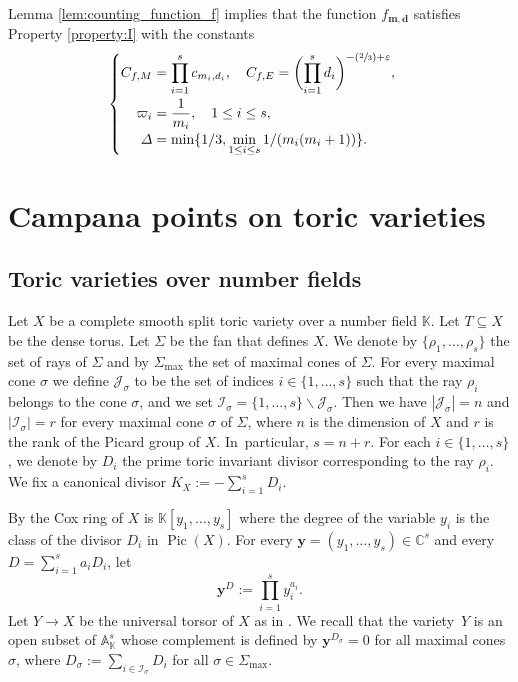 \documentclass[11pt]{article}
\numberwithin{equation}{section}
\newcommand{\Psfrac}[2]{(\sfrac{#1}{#2})}
\let\vardel\varDelta
\newcommand{\bfy}{\boldsymbol{y}}
\newcommand{\bfm}{{\boldsymbol{m}}}
\newcommand{\bfd}{\boldsymbol{d}}
\newcommand\CC{\mathbb{C}}
\newcommand{\KK}{\mathbb{K}}
\newcommand{\A}{\mathbb{A}}
\newcommand{\ii}[1]{\mathcal{J}_{#1}}
\newcommand{\ic}[1]{\mathcal{I}_{#1}}
\DeclareMathOperator{\pic}{Pic}
\theoremstyle{definition}
\numberwithin{theorem}{section}
\begin{document}
Lemma \ref{lem:counting_function_f} implies that the function $f_{\bfm, \bfd}$ satisfies Property \ref{property:I} with the constants
\[
\begin{cases}
\begin{aligned}
C_{f,M} &= \prod_{i=1}^s c_{m_i,d_i}, \quad C_{f,E} = \biggl(\prod_{i=1}^sd_i\biggr)^{-\Psfrac23+\varepsilon},\\
\varpi_i&= \frac{1}{m_i}, \quad 1\leq i\leq s,\\
\vardel &= \min \{ 1/3 , \min_{1\leq i\leq s}1/(m_i(m_i+1)) \}.
\end{aligned}
\end{cases}
\]

\section{Campana points on toric varieties}
\label{sec:Campana_points_on_toric_varieties}
\subsection{Toric varieties over number fields}

Let $X$ be a complete smooth split toric variety over a number field $\KK$.
Let $T\subseteq X$ be the dense torus.
Let $\Sigma$ be the fan that defines $X$.
We denote by $\{\rho_1,\dots,\rho_s\}$ the set of rays of $\Sigma$
and by $\Sigma_{\max}$ the set of maximal cones of $\Sigma$.
For every maximal cone $\sigma$ we define $\ii{\sigma}$ to be the set of indices
$i\in\{1,\dots,s\}$ such that the ray $\rho_i$ belongs to the cone $\sigma$,
and we set $\ic{\sigma}=\{1,\dots,s\}\smallsetminus \ii{\sigma}$.
Then we have $|\ii{\sigma}|=n$ and $|\ic{\sigma}|=r$ for every maximal cone $\sigma$ of $\Sigma$,
where $n$ is the dimension of $X$ and $r$ is the rank of the Picard group of $X$.
In~particular, $s=n+r$.
For each $i\in\{1,\dots,s\}$, we denote by $D_i$ the prime toric invariant divisor
corresponding to the ray $\rho_i$. We fix a canonical divisor $K_X:=-\sum_{i=1}^s D_i$.

By \cite{MR1299003} the Cox ring of $X$ is $\KK[y_1,\dots,y_s]$
where the degree of the variable $y_i$ is
the class of the divisor $D_i$ in $\pic(X)$.
For every $\bfy=(y_1,\dots,y_s)\in \CC^{s}$ and every $D=\sum_{i=1}^s a_i D_i$,
let \[
\bfy^D:=\prod_{i=1}^sy_i^{a_i}.
\]
Let $Y\to X$ be the universal torsor of $X$
as in \cite[\S8]{MR1679841}. We recall that the variety~$Y$ is an open subset of
$\A^{s}_{\KK}$ whose complement is defined by $\bfy^{D_\sigma}=0$ for all
maximal cones $\sigma$, where
$
D_\sigma:=\sum_{i\in\ic{\sigma}}D_i
$
for all $\sigma\in\Sigma_{\max}$.
\end{document}
